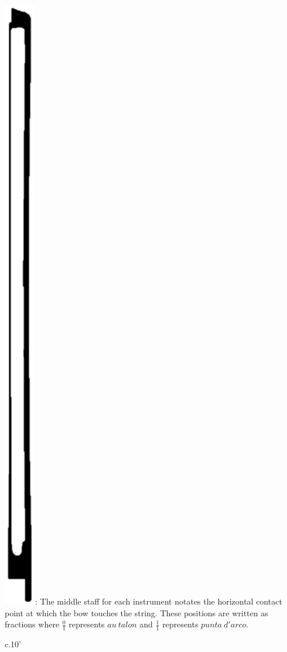 \documentclass[10pt]{article}
\begin{document}
 \includegraphics[height=0.025\textheight]{bow_position_tablature.eps}: The middle staff for each instrument notates the horizontal contact point at which the bow touches the string. These positions are written as fractions where \( \frac{0}{1} \) represents $au \ talon$ and \( \frac{1}{1} \) represents $punta \ d'arco$.

\vspace*{8\baselineskip}

\begin{center}
c.10'
\end{center}
\end{document}
